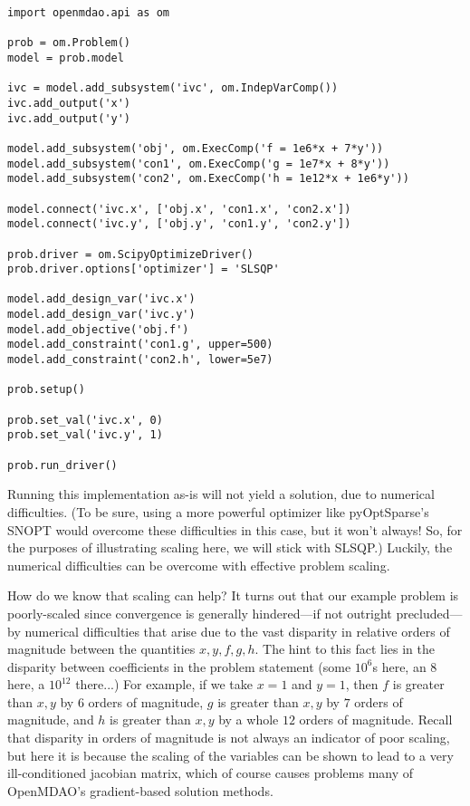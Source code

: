 \documentclass{article}
\begin{document}
\begin{lstlisting}[caption=Simple Optimization Problem Example in OpenMDAO, frame=single, backgroundcolor=\color{mygray}, label={lst:simple_ex}]
import openmdao.api as om

prob = om.Problem()
model = prob.model

ivc = model.add_subsystem('ivc', om.IndepVarComp())
ivc.add_output('x')
ivc.add_output('y')

model.add_subsystem('obj', om.ExecComp('f = 1e6*x + 7*y'))
model.add_subsystem('con1', om.ExecComp('g = 1e7*x + 8*y'))
model.add_subsystem('con2', om.ExecComp('h = 1e12*x + 1e6*y'))

model.connect('ivc.x', ['obj.x', 'con1.x', 'con2.x'])
model.connect('ivc.y', ['obj.y', 'con1.y', 'con2.y'])

prob.driver = om.ScipyOptimizeDriver()
prob.driver.options['optimizer'] = 'SLSQP'

model.add_design_var('ivc.x')
model.add_design_var('ivc.y')
model.add_objective('obj.f')
model.add_constraint('con1.g', upper=500)
model.add_constraint('con2.h', lower=5e7)

prob.setup()

prob.set_val('ivc.x', 0)
prob.set_val('ivc.y', 1)

prob.run_driver()
\end{lstlisting}

Running this implementation as-is will not yield a solution, due to numerical difficulties. (To be sure, using a more powerful optimizer like pyOptSparse's SNOPT would overcome these difficulties in this case, but it won't always! So, for the purposes of illustrating scaling here, we will stick with SLSQP.) Luckily, the numerical difficulties can be overcome with effective problem scaling.

How do we know that scaling can help? It turns out that our example problem is poorly-scaled since convergence is generally hindered---if not outright precluded---by numerical difficulties that arise due to the vast disparity in relative orders of magnitude between the quantities $x,y,f,g,h$. The hint to this fact lies in the disparity between coefficients in the problem statement (some $10^6$s here, an $8$ here, a $10^{12}$ there...) For example, if we take $x=1$ and $y=1$, then $f$ is greater than $x,y$ by $6$ orders of magnitude, $g$ is greater than $x,y$ by $7$ orders of magnitude, and $h$ is greater than $x,y$ by a whole $12$ orders of magnitude. Recall that disparity in orders of magnitude is not always an indicator of poor scaling, but here it is because the scaling of the variables can be shown to lead to a very ill-conditioned jacobian matrix, which of course causes problems many of OpenMDAO's gradient-based solution methods.
\end{document}
